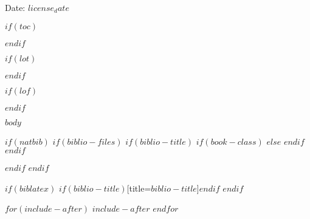 \documentclass[$if(fontsize)$$fontsize$,$endif$$if(lang)$$lang$,$endif$$if(papersize)$$papersize$,$endif$$for(classoption)$$classoption$$sep$,$endfor$,openany]{$documentclass$}
\begin{document}
Date: $license_date$

$if(toc)$
{
  \setcounter{tocdepth}{$toc-depth$}


  \hypersetup{linkcolor=black}
  \setcounter{secnumdepth}{-1}

  \tableofcontents

  \newpage
}
$endif$

$if(lot)$
\listoftables
$endif$

$if(lof)$
\listoffigures
$endif$

$body$

$if(natbib)$
  $if(biblio-files)$
    $if(biblio-title)$
      $if(book-class)$
        \renewcommand\bibname{$biblio-title$}
      $else$
        \renewcommand\refname{$biblio-title$}
      $endif$
    $endif$
    
  $endif$
$endif$

$if(biblatex)$
  \printbibliography$if(biblio-title)$[title=$biblio-title$]$endif$
$endif$

$for(include-after)$
  $include-after$
$endfor$
\end{document}
